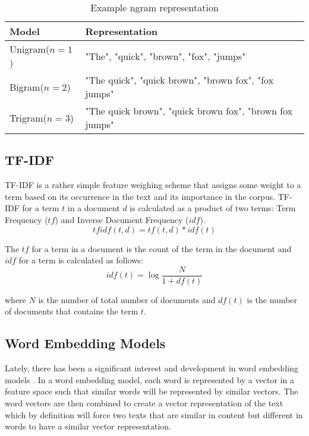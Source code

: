 \begin{table}[h]
\begin{center}
\caption{Example ngram representation}
\label{tbl:ngram_representation}
\begin{tabular}{p{3cm}p{8cm}}
\toprule 
Model&Representation\\
\midrule 
Unigram($n=1$)&"The", "quick", "brown", "fox", "jumps" \\
Bigram($n=2$)&"The quick", "quick brown", "brown fox", "fox jumps" \\
Trigram($n=3$)& "The quick brown", "quick brown fox", "brown fox jumps" \\
\bottomrule
\end{tabular}
\end{center}
\end{table}

\subsection{TF-IDF}
TF-IDF\cite{sparck1972statistical} is a rather simple feature weighing scheme that assigns some weight to a term based on its occurrence in the text and its importance in the corpus. TF-IDF for a term $t$ in a document $d$ is calculated as a product of two terms: Term Frequency ($tf$) and Inverse Document Frequency ($idf$). 
\begin{equation}
    \label{eq:tf_idf_equation}
    tfidf(t, d) = tf(t, d) * idf(t)
\end{equation}

The $tf$ for a term in a document is the count of the term in the document and $idf$ for a term is calculated as follows:
\begin{equation}
    \label{eq:idf_equation}
    idf(t) = \log{\frac{N}{1 + df(t)}}
\end{equation}

\noindent
where $N$ is the number of total number of documents and $df(t)$ is the number of documents that contains the term $t$.

\subsection{Word Embedding Models}
Lately, there has been a significant interest and development in word embedding models \cite{mikolov2013distributed, pennington2014glove, bojanowski2017enriching}. In a word embedding model, each word is represented by a vector in a feature space such that similar words will be represented by similar vectors\cite{mikolov2013distributed}. The word vectors are then combined to create a vector representation of the text which by definition will force two texts that are similar in content but different in words to have a similar vector representation.

